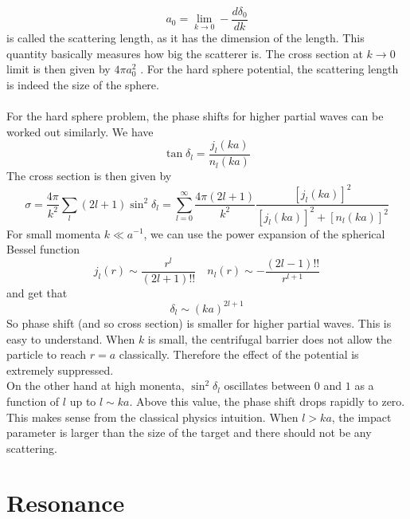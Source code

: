 \[a_0 = \lim_{k \to 0} -\frac{d\delta_0}{dk}\]
is called the scattering length, as it has the dimension of the length. This quantity basically measures how big the scatterer is. The cross section at $k \to 0$ limit is then given by $4\pi a_0^2$ . For the hard sphere potential, the scattering length is indeed the size of the sphere.
\\ \\
For the hard sphere problem, the phase shifts for higher partial waves can be worked out similarly. We have
\[\tan\delta_l = \frac{j_l(ka)}{n_l(ka)}\]
The cross section is then given by
\[\sigma = \frac{4\pi}{k^2} \sum_l (2l+1) \sin^2\delta_l = \sum_{l=0}^{\infty} \frac{4\pi(2l+1)}{k^2} \frac{[j_l(ka)]^2}{[j_l(ka)]^2+[n_l(ka)]^2}\]
For small momenta $k \ll a^{-1}$, we can use the power expansion of the spherical Bessel function
\[j_l(r) \sim \frac{r^{l}}{(2l+1)!!} \quad n_l(r) \sim -\frac{(2l-1)!!}{r^{l+1}}\]
and get that
\[\delta_l \sim (ka)^{2l+1}\]
So phase shift (and so cross section) is smaller for higher partial waves. This is easy to understand. When $k$ is small, the centrifugal barrier does not allow the particle to reach $r=a$ classically. Therefore the effect of the potential is extremely suppressed.\\
On the other hand at high monenta, $\sin^2\delta_l$ oscillates between $0$ and $1$ as a function of $l$ up to $l \sim ka$. Above this value, the phase shift drops rapidly to zero. This makes sense from the classical physics intuition. When $l > ka$,
the impact parameter is larger than the size of the target and there should not be any scattering.

\section{Resonance}
